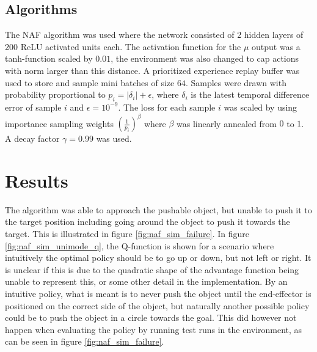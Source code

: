 \subsection{Algorithms}

The NAF algorithm was used where the network consisted of 2 hidden layers of
200 ReLU activated units each. The activation function for the $\mu$ output was
a tanh-function scaled by $0.01$, the environment was also changed to cap
actions with norm larger than this distance. A prioritized experience replay
buffer was used to store and sample mini batches of size $64$. Samples were
drawn with probability proportional to $p_i = |\delta_i| + \epsilon$, where
$\delta_i$ is the latest temporal difference error of sample $i$ and $\epsilon
= 10^{-9}$.  The loss for each sample $i$ was scaled by using importance
sampling weights $\left( \frac{1}{p_i}\right) ^\beta$ where $\beta$ was
linearly annealed from $0$ to $1$. A decay factor $\gamma = 0.99$ was used.

\section{Results}

The algorithm was able to approach the pushable object, but unable to push it
to the target position including going around the object to push it towards the
target. This is illustrated in figure \ref{fig:naf_sim_failure}. In figure
\ref{fig:naf_sim_unimode_q}, the Q-function is shown for a scenario where
intuitively the optimal policy should be to go up or down, but not left or
right. It is unclear if this is due to the quadratic shape of the advantage
function being unable to represent this, or some other detail in the
implementation. By an intuitive policy, what is meant is to never push the
object until the end-effector is positioned on the correct side of the object,
but naturally another possible policy could be to push the object in a circle
towards the goal. This did however not happen when evaluating the policy by
running test runs in the environment, as can be seen in figure
\ref{fig:naf_sim_failure}.

